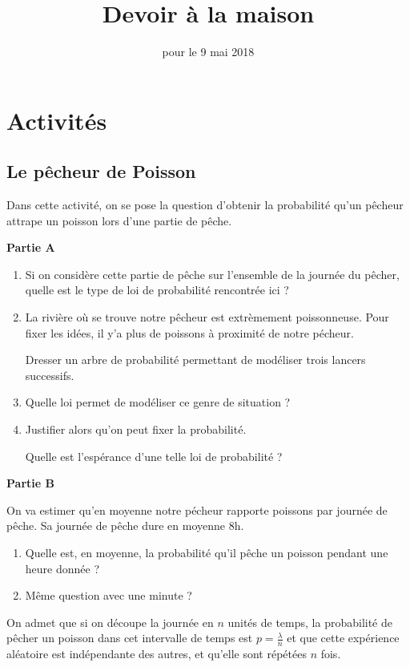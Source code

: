 \documentclass[12pt,a4paper,french]{article}
\title{Devoir à la maison \no{7}}
\author{\bsc{Jumel}}
\date{pour le 9 mai 2018}
\begin{document}
\noindent\maketitle

\bigskip

\section*{Activités}

\subsection*{Le pêcheur de Poisson}

Dans cette activité, on se pose la question d'obtenir la probabilité
qu'un pêcheur attrape un poisson lors d'une partie de pêche.

\textbf{Partie A}

\begin{enumerate}
  \item Si on considère cette partie de pêche sur l'ensemble de la
    journée du pêcher, quelle est le type de loi de probabilité
    rencontrée ici ?
  \item La rivière où se trouve notre pêcheur est extrèmement
    poissonneuse. Pour fixer les idées, il y'a plus de 
    poissons à proximité de notre pécheur.

    Dresser un arbre de probabilité permettant de modéliser trois
    lancers successifs.
  \item Quelle loi permet de modéliser ce genre de situation ?
  \item Justifier alors qu'on peut fixer la probabilité.

    Quelle est l'espérance d'une telle loi de probabilité ?
\end{enumerate}

\textbf{Partie B}

On va estimer qu'en moyenne notre pécheur rapporte  poissons par
journée de pêche. Sa journée de pêche dure en moyenne 8h.

\begin{enumerate}
  \item Quelle est, en moyenne, la probabilité qu'il pêche un poisson
    pendant une heure donnée ?
  \item Même question avec une minute ?
\end{enumerate}

On admet que si on découpe la journée en $n$ unités de temps, la
probabilité de pêcher un poisson dans cet intervalle de temps est
$p = \frac{\lambda}{n}$ et que cette expérience aléatoire est
indépendante des autres, et qu'elle sont répétées $n$ fois.
\end{document}
